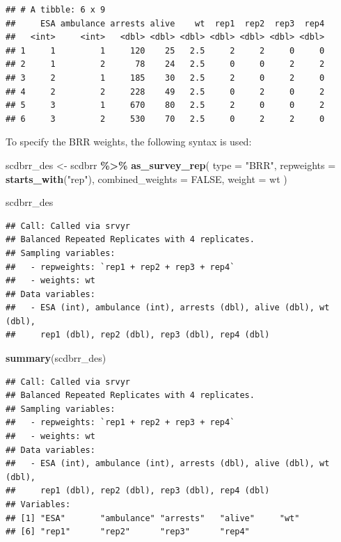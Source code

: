 \documentclass[
]{krantz}
\makeatletter
\newenvironment{Shaded}{\begin{snugshade}}{\end{snugshade}}
\newcommand{\AttributeTok}[1]{\textcolor[rgb]{0.27,0.27,0.27}{#1}}
\newcommand{\ConstantTok}[1]{\textcolor[rgb]{0.37,0.37,0.37}{#1}}
\newcommand{\FunctionTok}[1]{\textcolor[rgb]{0.27,0.27,0.27}{\textbf{#1}}}
\newcommand{\NormalTok}[1]{#1}
\newcommand{\OtherTok}[1]{\textcolor[rgb]{0.37,0.37,0.37}{#1}}
\newcommand{\SpecialCharTok}[1]{\textcolor[rgb]{0.43,0.43,0.43}{\textbf{#1}}}
\newcommand{\StringTok}[1]{\textcolor[rgb]{0.5,0.5,0.5}{#1}}
\newenvironment{kframe}{%
\medskip{}
\setlength{\fboxsep}{.8em}
 \def\at@end@of@kframe{}%
 \ifinner\ifhmode%
  \def\at@end@of@kframe{\end{minipage}}%
  \begin{minipage}{\columnwidth}%
 \fi\fi%
 \def\FrameCommand##1{\hskip\@totalleftmargin \hskip-\fboxsep
 \colorbox{shadecolor}{##1}\hskip-\fboxsep
     \hskip-\linewidth \hskip-\@totalleftmargin \hskip\columnwidth}%
 \MakeFramed {\advance\hsize-\width
   \@totalleftmargin\z@ \linewidth\hsize
   \@setminipage}}%
 {\par\unskip\endMakeFramed%
 \at@end@of@kframe}
\renewenvironment{Shaded}{\begin{kframe}}{\end{kframe}}
\makeatother
\begin{document}
\begin{verbatim}
## # A tibble: 6 x 9
##     ESA ambulance arrests alive    wt  rep1  rep2  rep3  rep4
##   <int>     <int>   <dbl> <dbl> <dbl> <dbl> <dbl> <dbl> <dbl>
## 1     1         1     120    25   2.5     2     2     0     0
## 2     1         2      78    24   2.5     0     0     2     2
## 3     2         1     185    30   2.5     2     0     2     0
## 4     2         2     228    49   2.5     0     2     0     2
## 5     3         1     670    80   2.5     2     0     0     2
## 6     3         2     530    70   2.5     0     2     2     0
\end{verbatim}

To specify the BRR weights, the following syntax is used:

\begin{Shaded}
\begin{Highlighting}[]
\NormalTok{scdbrr\_des }\OtherTok{\textless{}{-}}\NormalTok{ scdbrr }\SpecialCharTok{\%\textgreater{}\%}
  \FunctionTok{as\_survey\_rep}\NormalTok{(}
    \AttributeTok{type =} \StringTok{"BRR"}\NormalTok{,}
    \AttributeTok{repweights =} \FunctionTok{starts\_with}\NormalTok{(}\StringTok{"rep"}\NormalTok{),}
    \AttributeTok{combined\_weights =} \ConstantTok{FALSE}\NormalTok{,}
    \AttributeTok{weight =}\NormalTok{ wt}
\NormalTok{  )}

\NormalTok{scdbrr\_des}
\end{Highlighting}
\end{Shaded}

\begin{verbatim}
## Call: Called via srvyr
## Balanced Repeated Replicates with 4 replicates.
## Sampling variables:
##   - repweights: `rep1 + rep2 + rep3 + rep4` 
##   - weights: wt 
## Data variables: 
##   - ESA (int), ambulance (int), arrests (dbl), alive (dbl), wt (dbl),
##     rep1 (dbl), rep2 (dbl), rep3 (dbl), rep4 (dbl)
\end{verbatim}

\begin{Shaded}
\begin{Highlighting}[]
\FunctionTok{summary}\NormalTok{(scdbrr\_des)}
\end{Highlighting}
\end{Shaded}

\begin{verbatim}
## Call: Called via srvyr
## Balanced Repeated Replicates with 4 replicates.
## Sampling variables:
##   - repweights: `rep1 + rep2 + rep3 + rep4` 
##   - weights: wt 
## Data variables: 
##   - ESA (int), ambulance (int), arrests (dbl), alive (dbl), wt (dbl),
##     rep1 (dbl), rep2 (dbl), rep3 (dbl), rep4 (dbl)
## Variables: 
## [1] "ESA"       "ambulance" "arrests"   "alive"     "wt"       
## [6] "rep1"      "rep2"      "rep3"      "rep4"
\end{verbatim}
\end{document}
